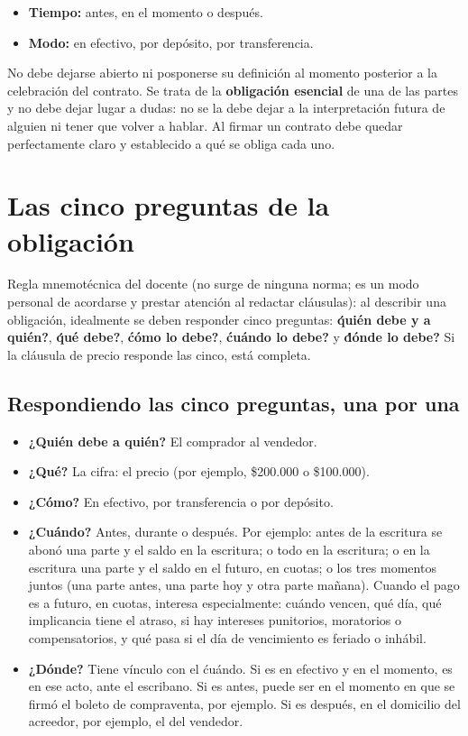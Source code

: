 \documentclass[12pt,oneside]{book}
\begin{document}
\begin{itemize}
    \item \textbf{Tiempo:} antes, en el momento o despu\'es.
    \item \textbf{Modo:} en efectivo, por dep\'osito, por transferencia.
\end{itemize}

No debe dejarse abierto ni posponerse su definici\'on al momento posterior a la celebraci\'on del contrato. Se trata de la \textbf{obligaci\'on esencial} de una de las partes y no debe dejar lugar a dudas: no se la debe dejar a la interpretaci\'on futura de alguien ni tener que volver a hablar. Al firmar un contrato debe quedar perfectamente claro y establecido a qu\'e se obliga cada uno.

\section{Las cinco preguntas de la obligaci\'on}

\begin{important}
Regla mnemot\'ecnica del docente (no surge de ninguna norma; es un modo personal de acordarse y prestar atenci\'on al redactar cl\'ausulas): al describir una obligaci\'on, idealmente se deben responder cinco preguntas: \textbf{\'qui\'en debe y a qui\'en?}, \textbf{\'qu\'e debe?}, \textbf{\'c\'omo lo debe?}, \textbf{\'cu\'ando lo debe?} y \textbf{\'d\'onde lo debe?} Si la cl\'ausula de precio responde las cinco, est\'a completa.
\end{important}

\subsection{Respondiendo las cinco preguntas, una por una}

\begin{itemize}
    \item \textbf{¿Qui\'en debe a qui\'en?} El comprador al vendedor.
    \item \textbf{¿Qu\'e?} La cifra: el precio (por ejemplo, \$200.000 o \$100.000).
    \item \textbf{¿C\'omo?} En efectivo, por transferencia o por dep\'osito.
    \item \textbf{¿Cu\'ando?} Antes, durante o despu\'es. Por ejemplo: antes de la escritura se abon\'o una parte y el saldo en la escritura; o todo en la escritura; o en la escritura una parte y el saldo en el futuro, en cuotas; o los tres momentos juntos (una parte antes, una parte hoy y otra parte ma\~nana). Cuando el pago es a futuro, en cuotas, interesa especialmente: cu\'ando vencen, qu\'e d\'ia, qu\'e implicancia tiene el atraso, si hay intereses punitorios, moratorios o compensatorios, y qu\'e pasa si el d\'ia de vencimiento es feriado o inh\'abil.
    \item \textbf{¿D\'onde?} Tiene v\'inculo con el \'cu\'ando. Si es en efectivo y en el momento, es en ese acto, ante el escribano. Si es antes, puede ser en el momento en que se firm\'o el boleto de compraventa, por ejemplo. Si es despu\'es, en el domicilio del acreedor, por ejemplo, el del vendedor.
\end{itemize}
\end{document}
